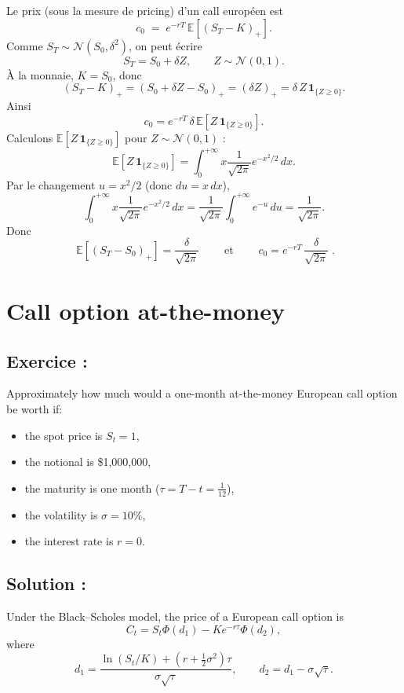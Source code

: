 Le prix (sous la mesure de pricing) d’un call européen est
\[
c_0 \;=\; e^{-rT}\,\mathbb{E}\!\left[(S_T-K)_+\right].
\]
Comme \(S_T \sim \mathcal{N}(S_0,\delta^2)\), on peut écrire
\[
S_T = S_0 + \delta Z,
\qquad Z \sim \mathcal{N}(0,1).
\]
À la monnaie, \(K=S_0\), donc
\[
(S_T-K)_+ = (S_0+\delta Z - S_0)_+ = (\delta Z)_+ = \delta\, Z\,\mathbf{1}_{\{Z\ge 0\}}.
\]
Ainsi
\[
c_0
= e^{-rT}\,\delta\,\mathbb{E}\!\left[ Z\,\mathbf{1}_{\{Z\ge 0\}}\right].
\]
Calculons \(\mathbb{E}[ Z\,\mathbf{1}_{\{Z\ge 0\}}]\) pour \(Z\sim\mathcal{N}(0,1)\) :
\[
\mathbb{E}\!\left[ Z\,\mathbf{1}_{\{Z\ge 0\}}\right]
= \int_0^{+\infty} x \frac{1}{\sqrt{2\pi}} e^{-x^2/2}\,dx.
\]
Par le changement \(u = x^2/2\) (donc \(du = x\,dx\)),
\[
\int_0^{+\infty} x \frac{1}{\sqrt{2\pi}} e^{-x^2/2}\,dx
= \frac{1}{\sqrt{2\pi}}\int_0^{+\infty} e^{-u}\,du
= \frac{1}{\sqrt{2\pi}}.
\]
Donc
\[
\boxed{\;\mathbb{E}\!\left[(S_T-S_0)_+\right] = \frac{\delta}{\sqrt{2\pi}}\;}
\qquad\text{et}\qquad
\boxed{\;c_0 = e^{-rT}\,\frac{\delta}{\sqrt{2\pi}}\;}.
\]

\section{Call option at-the-money}

\subsection*{Exercice :}

\begin{exerciseBox}
Approximately how much would a one-month at-the-money European call option be worth if:
\begin{itemize}
  \item the spot price is \(S_t = 1\),
  \item the notional is \$1{,}000{,}000,
  \item the maturity is one month (\(\tau = T-t = \tfrac{1}{12}\)),
  \item the volatility is \(\sigma = 10\%\),
  \item the interest rate is \(r=0\).
\end{itemize}
\end{exerciseBox}

\subsection*{Solution :}

Under the Black--Scholes model, the price of a European call option is
\[
C_t = S_t \Phi(d_1) - K e^{-r\tau}\Phi(d_2),
\]
where
\[
d_1 = \frac{\ln(S_t/K) + \left(r + \tfrac12\sigma^2\right)\tau}{\sigma\sqrt{\tau}},
\qquad
d_2 = d_1 - \sigma\sqrt{\tau}.
\]

